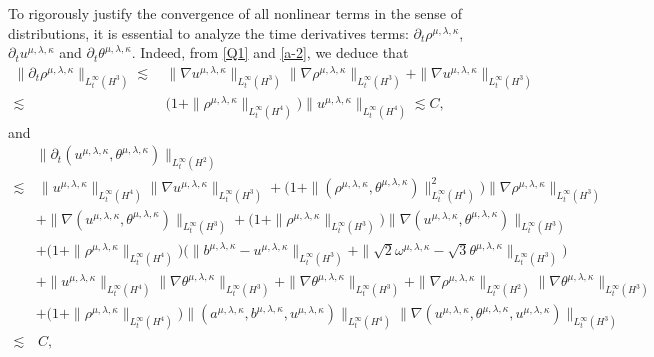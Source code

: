 \documentclass[reqno,11pt]{amsart}
\theoremstyle{plain}
\numberwithin{equation}{section}
\begin{document}
To rigorously justify the convergence of all nonlinear terms in the sense of distributions, it is essential to analyze the time derivatives terms: $\partial_t \rho^{\mu,\lambda,\kappa}$, $\partial_t u^{\mu,\lambda,\kappa}$  and $\partial_t \theta^{\mu,\lambda,\kappa}$.
Indeed, from \eqref{Q1} and \eqref{a-2}, we  deduce that  
\begin{align*}  
\|\partial_t\rho^{\mu,\lambda,\kappa}\|_{L^{\infty}_t(H^3)} \lesssim&\, \|\nabla u^{\mu,\lambda,\kappa}\|_{L^{\infty}_t(H^3)}\|\nabla\rho^{\mu,\lambda,\kappa}\|_{L^{\infty}_t(H^3)}+\|\nabla u^{\mu,\lambda,\kappa}\|_{L^{\infty}_t(H^3)}\nonumber\\
\lesssim&\,\big(1+\|\rho^{\mu,\lambda,\kappa}\|_{L^{\infty}_t(H^4)}\big)\|u^{\mu,\lambda,\kappa}
\|_{L^{\infty}_t(H^4)}%
\lesssim  C,
\end{align*}  
and  
\begin{align*}  
&\|\partial_t (u^{\mu,\lambda,\kappa}, \theta^{{\mu,\lambda,\kappa}})\|_{L^{\infty}_t(H^2)}\nonumber\\ 
\lesssim&\, \|u^{\mu,\lambda,\kappa}\|_{L_t^{\infty}(H^4)}\|\nabla u^{\mu,\lambda,\kappa}\|_{L_t^\infty(H^3)}+\big(1+\|(\rho^{\mu,\lambda,\kappa},\theta^{\mu,\lambda,\kappa})\|_{L_t^\infty(H^4)}^2\big)\|\nabla\rho^{\mu,\lambda,\kappa}\|_{L_t^\infty(H^3)}\nonumber\\
&+\|\nabla (u^{\mu,\lambda,\kappa},\theta^{\mu,\lambda,\kappa})\|_{L_t^\infty(H^3)}+\big(1+\|\rho^{\mu,\lambda,\kappa}\|_{L_t^\infty(H^3)}\big)\|\nabla(u^{\mu,\lambda,\kappa},\theta^{\mu,\lambda,\kappa})\|_{L_t^\infty(H^3)} \nonumber\\
&+\big(1+\|\rho^{\mu,\lambda,\kappa}\|_{L_t^\infty(H^4)}\big)\big( \|b^ {\mu,\lambda,\kappa}-u^{\mu,\lambda,\kappa}\|_{L_t^\infty(H^3)}+\|\sqrt{2}\omega ^{\mu,\lambda,\kappa}-\sqrt{3}\theta ^{\mu,\lambda,\kappa}\|_{L_t^\infty(H^3)} \big)\nonumber\\
&+\|  u^{\mu,\lambda,\kappa}\|_{L_t^\infty(H^4)}\|\nabla\theta^{\mu,\lambda,\kappa}\|_{L_t^\infty(H^3)}+\|\nabla\theta^{\mu,\lambda,\kappa}\|_{L_t^\infty(H^3)}+\|\nabla\rho^{\mu,\lambda,\kappa}\|_{L_t^\infty(H^2)}\|\nabla\theta^{\mu,\lambda,\kappa}\|_{L_t^\infty(H^3)}\nonumber\\
&+\big(1+\|\rho^{\mu,\lambda,\kappa}\|_{L_t^\infty(H^4)}\big)\|(a^{\mu,\lambda,\kappa},b^{\mu,\lambda,\kappa},u^{\mu,\lambda,\kappa})\|_{L_t^\infty(H^4)}\|\nabla(u^{\mu,\lambda,\kappa},\theta^{\mu,\lambda,\kappa},u^{\mu,\lambda,\kappa})\|_{L_t^\infty(H^3)}\nonumber\\
\lesssim&\, C,
\end{align*} 
\end{document}

